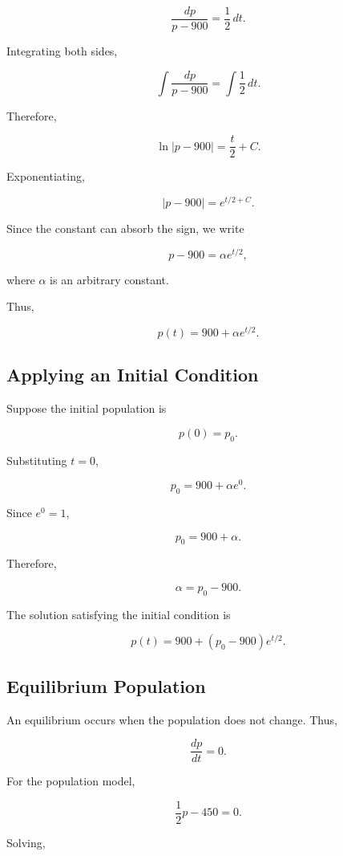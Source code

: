 \documentclass[11pt]{article}
\begin{document}
\[
\frac{dp}{p-900}
=
\frac{1}{2}\,dt.
\]

Integrating both sides,

\[
\int \frac{dp}{p-900}
=
\int \frac{1}{2}\,dt.
\]

Therefore,

\[
\ln|p-900|
=
\frac{t}{2}+C.
\]

Exponentiating,

\[
|p-900|
=
e^{t/2+C}.
\]

Since the constant can absorb the sign, we write

\[
p-900
=
\alpha e^{t/2},
\]

where $\alpha$ is an arbitrary constant.

Thus,

\[
\boxed{
p(t)=900+\alpha e^{t/2}
}.
\]

\subsection{Applying an Initial Condition}

Suppose the initial population is

\[
p(0)=p_0.
\]

Substituting $t=0$,

\[
p_0
=
900+\alpha e^0.
\]

Since $e^0=1$,

\[
p_0=900+\alpha.
\]

Therefore,

\[
\alpha=p_0-900.
\]

The solution satisfying the initial condition is

\[
\boxed{
p(t)
=
900+(p_0-900)e^{t/2}
}.
\]

\subsection{Equilibrium Population}

An equilibrium occurs when the population does not change. Thus,

\[
\frac{dp}{dt}=0.
\]

For the population model,

\[
\frac{1}{2}p-450=0.
\]

Solving,
\end{document}
